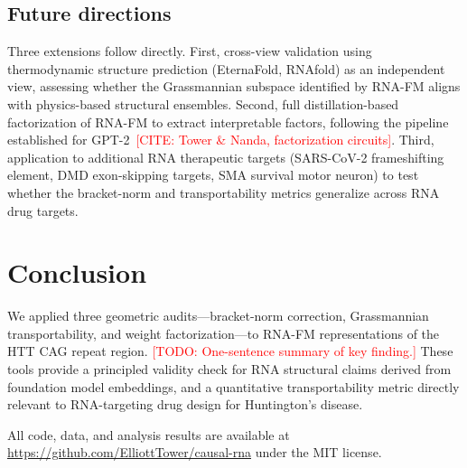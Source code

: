 \documentclass[11pt]{article}
\newcommand{\TODO}[1]{\textcolor{red}{[TODO: #1]}}
\newcommand{\CITE}[1]{\textcolor{red}{[CITE: #1]}}
\begin{document}
\subsection{Future directions}

Three extensions follow directly. First, cross-view validation using
thermodynamic structure prediction (EternaFold, RNAfold) as an
independent view, assessing whether the Grassmannian subspace identified
by RNA-FM aligns with physics-based structural ensembles. Second, full
distillation-based factorization of RNA-FM to extract interpretable
factors, following the pipeline established for
GPT-2~\CITE{Tower \& Nanda, factorization circuits}. Third, application
to additional RNA therapeutic targets (SARS-CoV-2 frameshifting element,
DMD exon-skipping targets, SMA survival motor neuron) to test whether
the bracket-norm and transportability metrics generalize across RNA
drug targets.


\section{Conclusion}
\label{sec:conclusion}

We applied three geometric audits---bracket-norm correction,
Grassmannian transportability, and weight factorization---to RNA-FM
representations of the HTT CAG repeat region. \TODO{One-sentence
summary of key finding.} These tools provide a principled validity
check for RNA structural claims derived from foundation model
embeddings, and a quantitative transportability metric directly
relevant to RNA-targeting drug design for Huntington's disease.

All code, data, and analysis results are available at
\url{https://github.com/ElliottTower/causal-rna} under the MIT license.



% 
\end{document}
